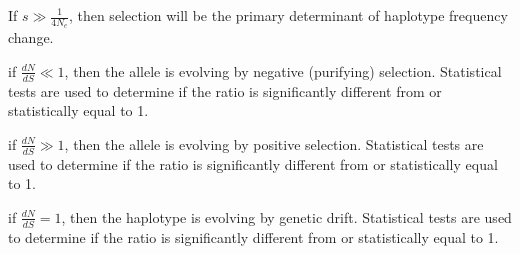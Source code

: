 \documentclass[11pt]{article}
\begin{document}
If $s \gg \frac{1}{4N_e}$, then selection will be the primary determinant of haplotype
frequency change.\medskip

if $\frac{dN}{dS} \ll 1$, then the allele is evolving by negative (purifying) selection.
Statistical tests are used to determine if the ratio is significantly
different from or statistically equal to 1.\medskip

if $\frac{dN}{dS} \gg 1$, then the allele is evolving by positive selection. Statistical
tests are used to determine if the ratio is significantly different from
or statistically equal to 1.\medskip

if $\frac{dN}{dS} = 1$, then the haplotype is evolving by genetic drift. Statistical tests
are used to determine if the ratio is significantly different from or
statistically equal to 1.\medskip
\end{document}
